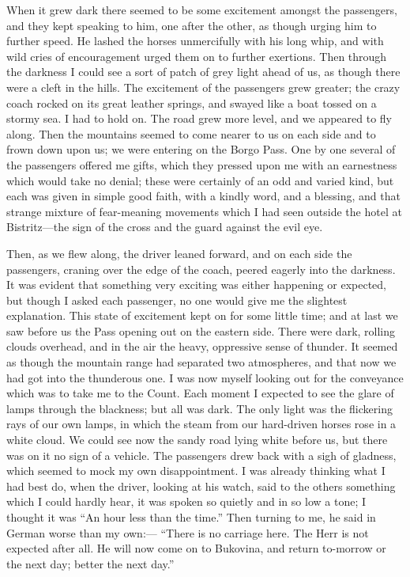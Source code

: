 \documentclass{article}
\begin{document}
				When it grew dark there seemed to be some excitement amongst the passengers, and they kept speaking to him, one after the other, as though urging him to further speed. He lashed the horses unmercifully with his long whip, and with wild cries of encouragement urged them on to further exertions. Then through the darkness I could see a sort of patch of grey light ahead of us, as though there were a cleft in the hills. The excitement of the passengers grew greater; the crazy coach rocked on its great leather springs, and swayed like a boat tossed on a stormy sea. I had to hold on. The road grew more level, and we appeared to fly along. Then the mountains seemed to come nearer to us on each side and to frown down upon us; we were entering on the Borgo Pass. One by one several of the passengers offered me gifts, which they pressed upon me with an earnestness which would take no denial; these were certainly of an odd and varied kind, but each was given in simple good faith, with a kindly word, and a blessing, and that strange mixture of fear-meaning movements which I had seen outside the hotel at Bistritz—the sign of the cross and the guard against the evil eye.\par\bigskip
				
				Then, as we flew along, the driver leaned forward, and on each side the passengers, craning over the edge of the coach, peered eagerly into the darkness. It was evident that something very exciting was either happening or expected, but though I asked each passenger, no one would give me the slightest explanation. This state of excitement kept on for some little time; and at last we saw before us the Pass opening out on the eastern side. There were dark, rolling clouds overhead, and in the air the heavy, oppressive sense of thunder. It seemed as though the mountain range had separated two atmospheres, and that now we had got into the thunderous one. I was now myself looking out for the conveyance which was to take me to the Count. Each moment I expected to see the glare of lamps through the blackness; but all was dark. The only light was the flickering rays of our own lamps, in which the steam from our hard-driven horses rose in a white cloud. We could see now the sandy road lying white before us, but there was on it no sign of a vehicle. The passengers drew back with a sigh of gladness, which seemed to mock my own disappointment. I was already thinking what I had best do, when the driver, looking at his watch, said to the others something which I could hardly hear, it was spoken so quietly and in so low a tone; I thought it was “An hour less than the time.” Then turning to me, he said in German worse than my own:— “There is no carriage here. The Herr is not expected after all. He will now come on to Bukovina, and return to-morrow or the next day; better the next day.”\par\bigskip
				
\end{document}

